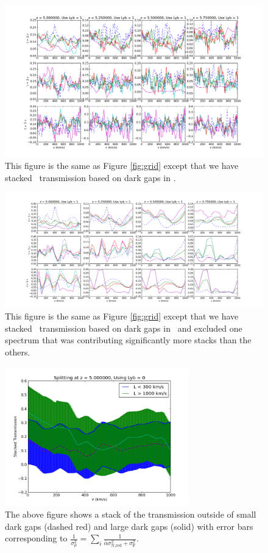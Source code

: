 \documentclass[11pt]{article}
\begin{document}
\begin{figure}[h]
  \centering
  \includegraphics[width=20cm]{gridPlot_UseLyb.png}
  \caption{This figure is the same as Figure \ref{fig:grid} except that we have stacked \lya\ transmission based on dark gaps in \lyb.}
  \label{fig:regrid}
\end{figure}

\begin{figure}[h]
  \centering
  \includegraphics[width=20cm]{gridPlot_noZ599_UseLyb.png}
  \caption{This figure is the same as Figure \ref{fig:grid} except that we have stacked \lya\ transmission based on dark gaps in \lyb\ and excluded one spectrum that was contributing significantly more stacks than the others.}
  \label{fig:regrid}
\end{figure}

\begin{figure}[h]
  \centering
  \includegraphics[width=8cm]{NewWeighting_ErrorBars.png}
  \caption{The above figure shows a stack of the transmission outside of small dark gaps (dashed red) and large dark gaps (solid) with error bars corresponding to $\frac{1}{\sigma_{\mu}^{2}} = \sum_i \frac{1}{\bar{\alpha} \sigma_{\text{N,red}}^{2} + \sigma_{\text{F}}^{2}}$. }
  \label{fig:todo}
\end{figure}
\end{document}
